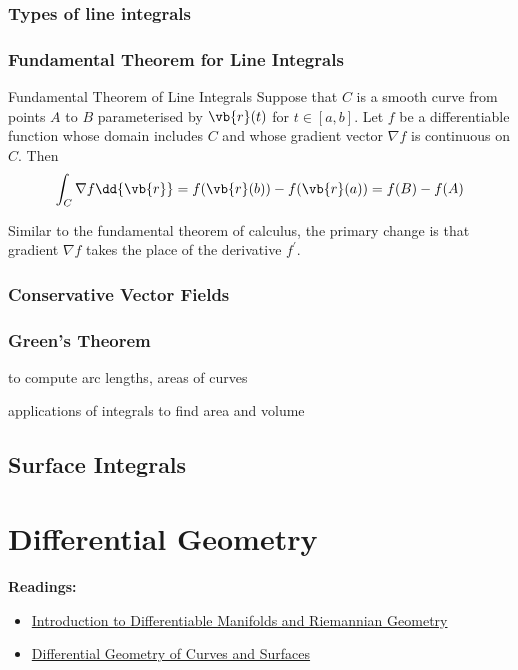 \section{Types of line integrals}

\section{Fundamental Theorem for Line Integrals}
\begin{thrm}{Fundamental Theorem of Line Integrals}{}
Suppose that $C$ is a smooth curve from points $A$ to $B$ parameterised by $\vb{r}(t)$ for $t\in[a,b]$. Let $f$ be a differentiable function whose domain includes $C$ and whose gradient vector $\nabla f$ is continuous on $C$. Then
\begin{equation}
\int_C \nabla f \dd{\vb{r}} = f(\vb{r}(b)) - f(\vb{r}(a)) = f(B) - f(A)
\end{equation}
\end{thrm}
\begin{remark}
Similar to the fundamental theorem of calculus, the primary change is that gradient $\nabla f$ takes the place of the derivative $f^\prime$.
\end{remark}

\section{Conservative Vector Fields}

\section{Green's Theorem}


to compute arc lengths, areas of curves 

applications of integrals to find area and volume

\chapter{Surface Integrals}


\part{Differential Geometry}
\textbf{Readings:}
\begin{itemize}
\item \href{https://aetemad.iut.ac.ir/sites/aetemad.iut.ac.ir/files/files_course/william_m._boothby_an_introduction_to_differentibookfi.org_.pdf}{Introduction to Differentiable Manifolds and Riemannian Geometry}
\item \href{http://www2.ing.unipi.it/griff/files/dC.pdf}{Differential Geometry of Curves and Surfaces}
\end{itemize}